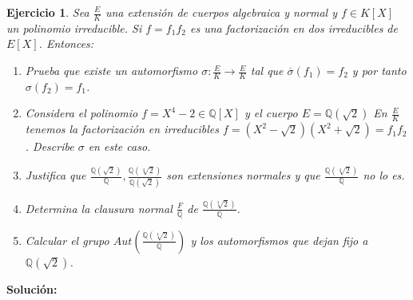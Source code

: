 \documentclass{article}
\theoremstyle{theorem-style}  %
\theoremstyle{definition-style}
\theoremstyle{example-style}
\newtheorem{exercise}{Ejercicio}[section]
\begin{document}
\begin{exercise}
Sea $\frac{E}{K}$ una extensión de cuerpos algebraica y normal y $f \in K[X]$ un polinomio irreducible. Si $f = f_1f_2$ es una factorización en dos irreducibles de $E[X]$. Entonces:

\begin{enumerate}
\item Prueba que existe un automorfismo $\sigma:\frac{E}{K} \to \frac{E}{K}$ tal que $\overline{\sigma}(f_1) = f_2$ y por tanto $\sigma(f_2) = f_1$. 
\item Considera el polinomio $f = X^4 - 2 \in \mathbb{Q}[X]$ y el cuerpo $E = \mathbb{Q}(\sqrt{2})$ En $\frac{E}{K}$ tenemos la factorización en irreducibles $f = (X^2 - \sqrt{2})(X^2+\sqrt{2}) = f_1f_2$. Describe $\sigma$ en este caso. 
\item Justifica que $\frac{\mathbb{Q}(\sqrt{2})}{\mathbb{Q}}, \frac{\mathbb{Q}(\sqrt[4]{2})}{\mathbb{Q}(\sqrt{2})}$ son extensiones normales y que $\frac{\mathbb{Q}(\sqrt[4]{2})}{\mathbb{Q}}$ no lo es.
\item Determina la clausura normal $\frac{F}{\mathbb{Q}}$ de $\frac{\mathbb{Q}(\sqrt[4]{2})}{\mathbb{Q}}$.
\item Calcular el grupo $Aut(\frac{\mathbb{Q}(\sqrt[4]{2})}{\mathbb{Q}})$ y los automorfismos que dejan fijo a $\mathbb{Q}(\sqrt{2})$. 
\end{enumerate}
\end{exercise}
\textbf{Solución:}
\end{document}
